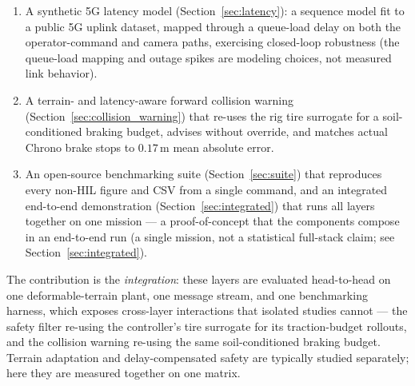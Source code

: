 \documentclass[conference,letterpaper,10pt]{IEEEtran}
\begin{document}
\begin{enumerate}
        (Section~\ref{sec:safety}) pairing in-horizon NMPC softplus
        barriers with a swappable downstream safety filter; the default
        instance is an intent-preserving DOB-CBF-QP inspired
        by~\cite{Zhang25}, with physical steering/throttle rate limits
        imposed directly in the QP. Its effect is quantified by a deterministic
        \emph{counterfactual replay} --- replaying a fixed command trace
        (filter off vs.\ on) on the identical scenario --- giving a
        paired, reproducible collision-prevention measurement over a
        scripted population of worst-case drive-into-hazard commands (a
        proxy for an inattentive or latency-overwhelmed operator).
  \item A synthetic 5G latency model (Section~\ref{sec:latency}): a
        sequence model fit to a public 5G uplink dataset, mapped through a
        queue-load delay on both the operator-command and camera paths,
        exercising closed-loop robustness (the queue-load mapping and outage
        spikes are modeling choices, not measured link behavior).
  \item A terrain- and latency-aware forward collision warning
        (Section~\ref{sec:collision_warning}) that re-uses the rig
        tire surrogate for a soil-conditioned braking budget, advises
        without override, and matches actual Chrono brake stops to
        $0.17\,\mathrm{m}$ mean absolute error.
  \item An open-source benchmarking suite
        (Section~\ref{sec:suite}) that reproduces every non-HIL
        figure and CSV from a single command, and an integrated
        end-to-end demonstration (Section~\ref{sec:integrated}) that runs
        all layers together on one mission --- a proof-of-concept that the
        components compose in an end-to-end run (a single mission, not a
        statistical full-stack claim; see Section~\ref{sec:integrated}).
\end{enumerate}

The contribution is the \emph{integration}: these layers are evaluated
head-to-head on one deformable-terrain plant, one message stream, and one
benchmarking harness, which exposes cross-layer interactions that isolated
studies cannot --- the safety filter re-using the controller's tire
surrogate for its traction-budget rollouts, and the collision warning
re-using the same soil-conditioned braking budget. Terrain adaptation and
delay-compensated safety are typically studied separately; here they are
measured together on one matrix.
\end{document}
